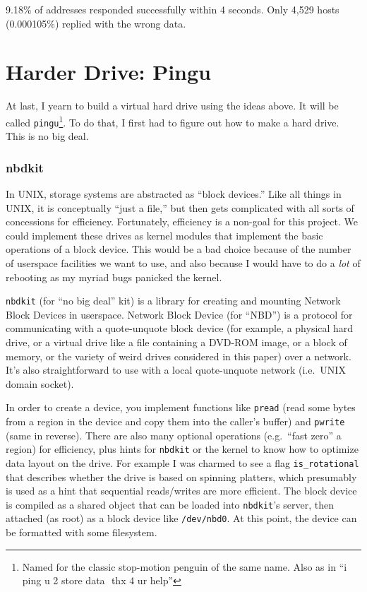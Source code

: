 \documentclass[twocolumn]{article}
\begin{document}
9.18\% of addresses responded successfully within 4 seconds. Only
4,529 hosts (0.000105\%) replied with the wrong data.

\section{Harder Drive: Pingu} \label{sec:pingu}

At last, I yearn to build a virtual hard drive using the ideas above.
It will be called {\tt pingu}\footnote{Named for the classic
  stop-motion penguin of the same name. Also as in ``i ping u 2 store
  data\,\, thx 4 ur help''}. To do that, I first had to figure out how
to make a hard drive. This is no big deal.

\subsubsection{nbdkit} \label{sec:nbdkit}

In UNIX, storage systems are abstracted as ``block devices.'' Like all
things in UNIX, it is conceptually ``just a file,'' but then gets
complicated with all sorts of concessions for efficiency. Fortunately,
efficiency is a non-goal for this project. We could implement these
drives as kernel modules that implement the basic operations of a
block device. This would be a bad choice because of the number of
userspace facilities we want to use, and also because I would have to
do a {\em lot} of rebooting as my myriad bugs panicked the kernel.

{\tt nbdkit} (for ``no big deal'' kit) is a library for creating and
mounting Network Block Devices in userspace. Network Block Device (for
``NBD'') is a protocol for communicating with a quote-unquote block
device (for example, a physical hard drive, or a virtual drive like a
file containing a DVD-ROM image, or a block of memory, or the variety
of weird drives considered in this paper) over a network. It's also
straightforward to use with a local quote-unquote network (i.e.~UNIX
domain socket).

In order to create a device, you implement functions like {\tt pread}
(read some bytes from a region in the device and copy them into the
caller's buffer) and {\tt pwrite} (same in reverse). There are also
many optional operations (e.g.~``fast zero'' a region) for efficiency,
plus hints for {\tt nbdkit} or the kernel to know how to optimize data
layout on the drive. For example I was charmed to see a flag
\verb+is_rotational+ that describes whether the drive is based on
spinning platters, which presumably is used as a hint that sequential
reads/writes are more efficient. The block device is compiled as a
shared object that can be loaded into {\tt nbdkit}'s server, then
attached (as root) as a block device like {\tt /dev/nbd0}. At this
point, the device can be formatted with some filesystem.
\end{document}
